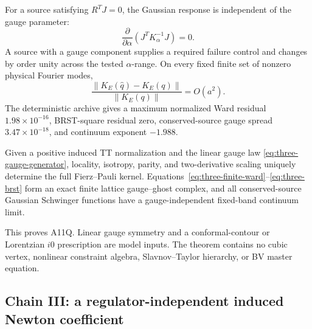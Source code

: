 For a source satisfying \(R^TJ=0\), the Gaussian response is independent of
the gauge parameter:
\begin{equation}
 \frac{\partial}{\partial\alpha}
 \left(J^TK_\alpha^{-1}J\right)=0 .
\label{eq:three-source-gauge}
\end{equation}
A source with a gauge component supplies a required failure control and
changes by order unity across the tested \(\alpha\)-range.  On every fixed
finite set of nonzero physical Fourier modes,
\begin{equation}
 \frac{\|K_E(\widehat q)-K_E(q)\|}{\|K_E(q)\|}
 =O(a^2).
\label{eq:three-full-band}
\end{equation}
The deterministic archive gives a maximum normalized Ward residual
\(1.98\times10^{-16}\), BRST-square residual zero, conserved-source gauge
spread \(3.47\times10^{-18}\), and continuum exponent \(-1.988\).

\begin{theorem}
\label{thm:three-constraint-complete}
Given a positive induced TT normalization and the linear gauge law
\eqref{eq:three-gauge-generator}, locality, isotropy, parity, and
two-derivative scaling uniquely determine the full Fierz--Pauli kernel.
Equations~\eqref{eq:three-finite-ward}--\eqref{eq:three-brst} form an exact
finite lattice gauge--ghost complex, and all conserved-source Gaussian
Schwinger functions have a gauge-independent fixed-band continuum limit.
\end{theorem}

This proves A11Q.  Linear gauge symmetry and a conformal-contour or
Lorentzian \(i0\) prescription are model inputs.  The theorem contains no
cubic vertex, nonlinear constraint algebra, Slavnov--Taylor hierarchy, or
BV master equation.

\subsection{Chain III: a regulator-independent induced Newton coefficient}

